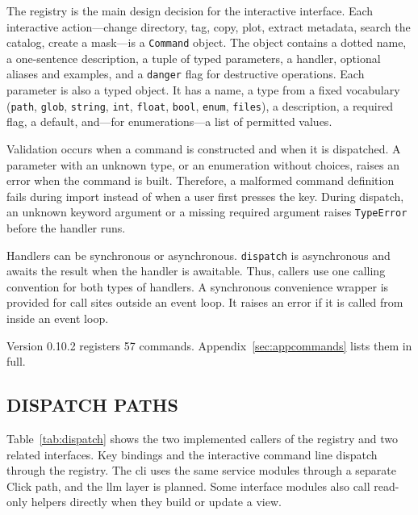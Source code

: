 \documentclass[tm]{ornltm}
\begin{document}
The registry is the main design decision for the interactive interface. Each
interactive action---change directory, tag, copy, plot, extract metadata, search
the catalog, create a mask---is a \texttt{Command} object. The object contains a
dotted name, a one-sentence description, a tuple of typed parameters, a handler,
optional aliases and examples, and a \texttt{danger} flag for destructive
operations. Each parameter is also a typed object. It has a name, a type from a
fixed vocabulary (\texttt{path}, \texttt{glob},
\texttt{string}, \texttt{int}, \texttt{float}, \texttt{bool}, \texttt{enum},
\texttt{files}), a description, a required flag, a default, and---for
enumerations---a list of permitted values.

Validation occurs when a command is constructed and when it is dispatched. A
parameter with an unknown type, or an enumeration without choices, raises an
error when the command is built. Therefore, a malformed command definition
fails during import instead of when a user first presses the key. During
dispatch, an unknown keyword argument or a missing required argument raises
\texttt{TypeError} before the handler runs.

Handlers can be synchronous or asynchronous. \texttt{dispatch} is asynchronous
and awaits the result when the handler is awaitable. Thus, callers use one
calling convention for both types of handlers. A synchronous convenience
wrapper is provided for call sites outside an event loop. It raises an error if
it is called from inside an event loop.

Version 0.10.2 registers 57 commands. Appendix~\ref{sec:appcommands} lists them
in full.

\subsection{DISPATCH PATHS}

Table~\ref{tab:dispatch} shows the two implemented callers of the registry and
two related interfaces. Key bindings and the interactive command line dispatch
through the registry. The \ac{cli} uses the same service modules through a
separate Click path, and the \ac{llm} layer is planned. Some interface modules
also call read-only helpers directly when they build or update a view.
\end{document}
